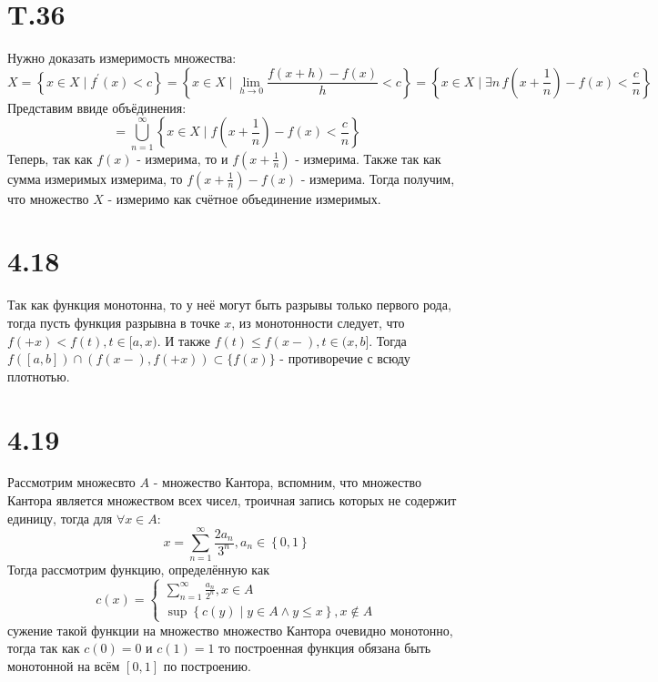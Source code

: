 \documentclass[12pt]{article}
\begin{document}
\section{T.36}
Нужно доказать измеримость множества: 
\[
    X = \left\{ x \in X \mid f^{\prime}(x) < c \right\} = 
    \left\{ x \in X \mid \lim_{h \to 0} \frac{f(x + h) - f(x)}{h} < c\right\} = 
    \left\{ x \in  X \mid \exists n \, f \left( x + \frac{1}{n} \right)   - f(x) < \frac{c}{n} \right\}
\]
Представим ввиде объёдинения: 
\[
    = \bigcup_{n=1}^{\infty} \left\{ x \in X \mid f \left( x + \frac{1}{n} \right)  - f(x) < \frac{c}{n} \right\}  
\]
Теперь, так как $f(x)$ - измерима, то и $f(x + \frac{1}{n})$ - измерима. Также 
так как сумма измеримых измерима, то $f(x + \frac{1}{n}) - f(x)$ - измерима. Тогда получим, что 
множество $X$ - измеримо как счётное объединение измеримых.    

\section{4.18}
Так как функция монотонна, то у неё могут быть разрывы только первого рода, тогда пусть 
функция разрывна в точке $x$, из монотонности следует, что $f(+x) < f(t), t \in [a, x)$. 
И также $f(t) \leq f(x-), t \in (x, b]$. Тогда $f([a, b]) \cap (f(x-), f(+x)) \subset \{f(x)\}$ - 
противоречие с всюду плотнотью.

\section{4.19}
Рассмотрим множесвто $A$ - множество Кантора, вспомним, что множество Кантора является 
множеством всех чисел, троичная запись которых не содержит единицу, тогда для $\forall x \in A$: 
\[
    x = \sum_{n=1}^{\infty} \frac{2 a_n}{3^n}, a_n \in \left\{ 0, 1 \right\} 
\]  
Тогда рассмотрим функцию, определённую как
\[
    c(x) = \begin{cases}
        \sum_{n=1}^{\infty} \frac{a_n}{2^n}, x \in A \\
        \sup \left\{c(y) \mid y \in A \land y \leq x \right\}, x \not \in A
    \end{cases}
\]
сужение такой функции на множество множество Кантора очевидно монотонно, тогда так как 
$c(0) = 0$ и $c(1) = 1$ то построенная функция обязана быть монотонной на всём $[0, 1]$ по построению.   
\end{document}
